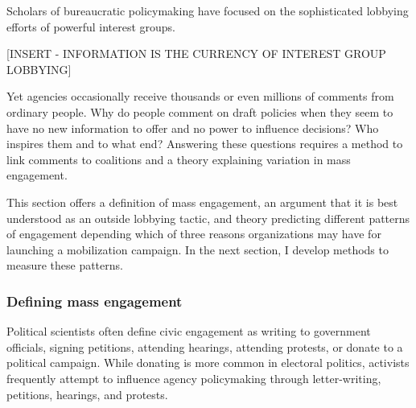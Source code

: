 
Scholars of bureaucratic policymaking have focused on the sophisticated lobbying efforts of powerful interest groups. 

[INSERT - INFORMATION IS THE CURRENCY OF INTEREST GROUP LOBBYING]



Yet agencies occasionally receive thousands or even millions of comments from ordinary people. 
Why do people comment on draft policies when they seem to have no new information to offer and no power to influence decisions? Who inspires them and to what end? 
Answering these questions requires a method to link comments to coalitions and a theory explaining variation in mass engagement.  

This section offers a definition of mass engagement, an argument that it is best understood as an outside lobbying tactic, and theory predicting different patterns of engagement depending which of three reasons organizations may have for launching a mobilization campaign. In the next section, I develop methods to measure these patterns.



\subsubsection{Defining mass engagement}
Political scientists often define civic engagement as writing to government officials, signing petitions, attending hearings, attending protests, or donate to a political campaign. While donating is more common in electoral politics, activists frequently attempt to influence agency policymaking through letter-writing, petitions, hearings, and protests. 

